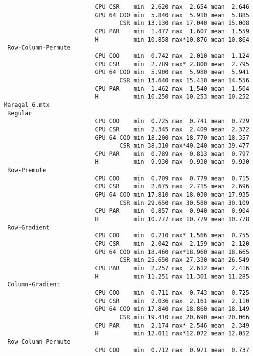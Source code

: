 {\begin{verbatim}
                          CPU CSR    min  2.620 max  2.654 mean  2.646
                          GPU 64 COO min  5.840 max  5.910 mean  5.885
                                 CSR min 13.130 max 17.040 mean 15.008
                          CPU PAR    min  1.477 max  1.607 mean  1.559
                          H          min 10.858 max*10.876 mean 10.864
 Row-Column-Permute
                          CPU COO    min  0.742 max  2.010 mean  1.124
                          CPU CSR    min  2.789 max* 2.800 mean  2.795
                          GPU 64 COO min  5.900 max  5.980 mean  5.941
                                 CSR min 13.640 max 15.410 mean 14.556
                          CPU PAR    min  1.462 max  1.540 mean  1.504
                          H          min 10.250 max 10.253 mean 10.252
Maragal_6.mtx
 Regular
                          CPU COO    min  0.725 max  0.741 mean  0.729
                          CPU CSR    min  2.345 max  2.409 mean  2.372
                          GPU 64 COO min 18.200 max 18.770 mean 18.357
                                 CSR min 38.310 max*40.240 mean 39.477
                          CPU PAR    min  0.789 max  0.813 mean  0.797
                          H          min  9.930 max  9.930 mean  9.930
 Row-Premute
                          CPU COO    min  0.709 max  0.779 mean  0.715
                          CPU CSR    min  2.675 max  2.715 mean  2.696
                          GPU 64 COO min 17.810 max 18.030 mean 17.935
                                 CSR min 29.650 max 30.580 mean 30.109
                          CPU PAR    min  0.857 max  0.940 mean  0.904
                          H          min 10.777 max 10.779 mean 10.778
 Row-Gradient
                          CPU COO    min  0.710 max* 1.566 mean  0.755
                          CPU CSR    min  2.042 max  2.159 mean  2.120
                          GPU 64 COO min 18.460 max*18.960 mean 18.665
                                 CSR min 25.650 max 27.330 mean 26.549
                          CPU PAR    min  2.257 max  2.612 mean  2.416
                          H          min 11.251 max 11.301 mean 11.285
 Column-Gradient
                          CPU COO    min  0.711 max  0.743 mean  0.725
                          CPU CSR    min  2.036 max  2.161 mean  2.110
                          GPU 64 COO min 17.840 max 18.860 mean 18.149
                                 CSR min 19.410 max 20.690 mean 20.066
                          CPU PAR    min  2.174 max* 2.546 mean  2.349
                          H          min 12.011 max*12.072 mean 12.052
 Row-Column-Permute
                          CPU COO    min  0.712 max  0.971 mean  0.737

\end{verbatim}}
